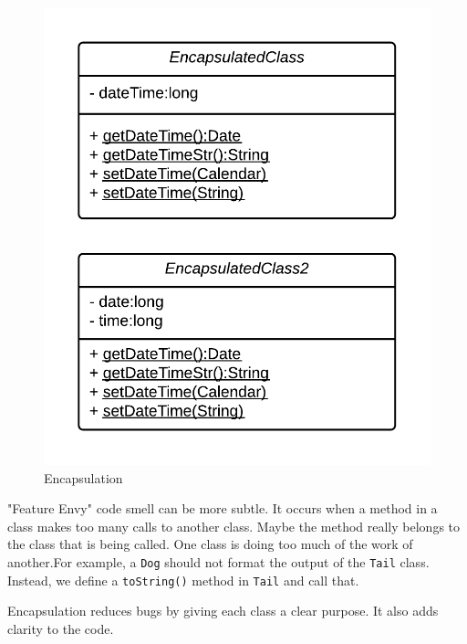 \begin{figure}[!h]\centering %
\includegraphics[width=0.9\linewidth, frame]{images/encapsulation}
\caption{Encapsulation}
\label{fig:encapsulation}
\end{figure}
"Feature Envy" code smell can be more subtle. It occurs when a method in a class makes too many calls to another class. Maybe the method really belongs to the class that is being called\cite{codesmells}. One class is doing too much of the work of another.For example, a \texttt{Dog} should not format the output of the \texttt{Tail} class. Instead, we define a \texttt{toString()} method in \texttt{Tail} and call that.

Encapsulation reduces bugs by giving each class a clear purpose. It also adds clarity to the code.
